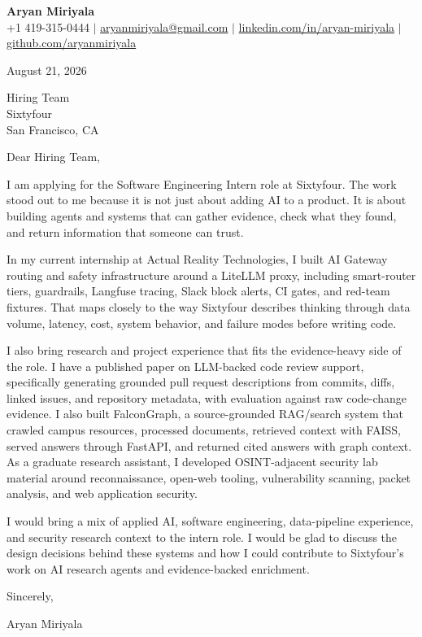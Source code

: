 \documentclass[letterpaper,11pt]{article}
\begin{document}
\begin{center}
  {\LARGE \textbf{Aryan Miriyala}}\\[-1pt]
  \small
  +1 419-315-0444 $|$
  \href{mailto:aryanmiriyala@gmail.com}{aryanmiriyala@gmail.com} $|$
  \href{https://www.linkedin.com/in/aryan-miriyala-7788a21b6/}{linkedin.com/in/aryan-miriyala} $|$
  \href{https://github.com/aryanmiriyala}{github.com/aryanmiriyala}
\end{center}

\vspace{8pt}

August 21, 2026

Hiring Team\\
Sixtyfour\\
San Francisco, CA

Dear Hiring Team,

I am applying for the Software Engineering Intern role at Sixtyfour. The work stood out to me because it is not just about adding AI to a product. It is about building agents and systems that can gather evidence, check what they found, and return information that someone can trust.

In my current internship at Actual Reality Technologies, I built AI Gateway routing and safety infrastructure around a LiteLLM proxy, including smart-router tiers, guardrails, Langfuse tracing, Slack block alerts, CI gates, and red-team fixtures. That maps closely to the way Sixtyfour describes thinking through data volume, latency, cost, system behavior, and failure modes before writing code.

I also bring research and project experience that fits the evidence-heavy side of the role. I have a published paper on LLM-backed code review support, specifically generating grounded pull request descriptions from commits, diffs, linked issues, and repository metadata, with evaluation against raw code-change evidence. I also built FalconGraph, a source-grounded RAG/search system that crawled campus resources, processed documents, retrieved context with FAISS, served answers through FastAPI, and returned cited answers with graph context. As a graduate research assistant, I developed OSINT-adjacent security lab material around reconnaissance, open-web tooling, vulnerability scanning, packet analysis, and web application security.

I would bring a mix of applied AI, software engineering, data-pipeline experience, and security research context to the intern role. I would be glad to discuss the design decisions behind these systems and how I could contribute to Sixtyfour's work on AI research agents and evidence-backed enrichment.

Sincerely,

Aryan Miriyala
\end{document}
